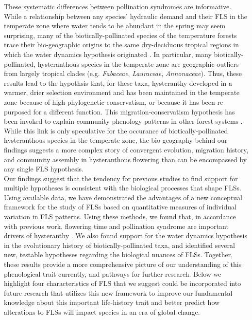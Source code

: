 \documentclass[12pt]{article}
\begin{document}
\noindent These systematic differences between pollination syndromes are informative. While a relationship between any species' hydraulic demand and their FLS in the temperate zone where water tends to be abundant in the spring \citep{Polgar2011} may seem surprising, many of the biotically-pollinated species of the temperature forests trace their bio-geographic origins to the same dry-deciduous tropical regions \citep{Daubenmire1972} in which the water dynamics hypothesis originated \citep{Janzen1967,Franklin2016}. In particular, many biotically-pollinated, hysteranthous species in the temperate zone are geographic outliers from largely tropical clades (e.g. \textit{Fabaceae}, \textit{Lauraceae}, \textit{Annonaceae}). Thus, these results lead to the hypothsis that, for these taxa, hysteranthy developed in a warmer, drier selection environment and has been maintained in the temperate zone because of high phylogenetic conservatism, or because it has been re-purposed for a different function. 
This migration-conservatism hypothesis has been invoked to explain community phenology patterns in other forest systems \citep[i.e. general flowering in dipterocarps,][]{Kurten2018}. While this link is only speculative for the occurance of biotically-pollinated hysteranthous species in the temperate zone, the bio-geography behind our findings suggests a more complex story of convergent evolution, migration history, and community assembly in hysteranthous flowering than can be encompassed by any single FLS hypothesis.\\

\noindent Our findings suggest that the tendency for previous studies to find support for multiple hypotheses \citep{Bolmgren2003,Gougherty2018,Savage2019} is consistent with the biological processes that shape FLSs. Using available data, we have demonstrated the advantages of a new conceptual framework for the study of FLSs based on quantitative measures of individual variation in FLS patterns. Using these methods, we found that, in accordance with previous work, flowering time and pollination syndrome are important drivers of hysteranthy \citep{Gougherty2018}. We also found support for the water dynamics hypothesis in the evolutionary history of biotically-pollinated taxa, and identified several new, testable hypotheses regarding the biological nuances of FLSs. Together, these results provide a more comprehensive picture of our understanding of this phenological trait currently, and pathways for further research. Below we highlight four characteristics of FLS that we suggest could be incorporated into future research that utilizes this new framework to improve our fundamental knowledge about this important life-history trait and better predict how alterations to FLSs will impact species in an era of global change.\\
\end{document}
